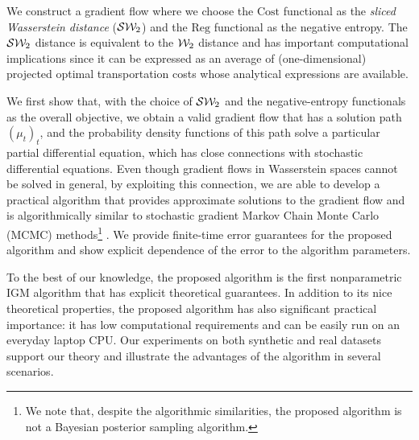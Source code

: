 We construct a gradient flow where we choose the $\mathrm{Cost}$ functional as the \textit{sliced Wasserstein distance} (${\cal S}{\cal W}_2$) \cite{rabin:et:al:2011,bonneel2015sliced} and the $\mathrm{Reg}$ functional as the negative entropy. The ${\cal S}{\cal W}_2$ distance is equivalent to the ${\cal W}_2$ distance \cite{bonnotte2013unidimensional} and has important computational implications since it can be expressed as an average of (one-dimensional) projected optimal transportation costs whose analytical expressions are available.

We first show that, with the choice of ${\cal S}{\cal W}_2$ and the negative-entropy functionals as the overall objective, we obtain a valid gradient flow that has a solution path $(\mu_t)_t$, and the probability density functions of this path solve a particular partial differential equation, which has close connections with stochastic differential equations. Even though gradient flows in Wasserstein spaces cannot be solved in general, by exploiting this connection, we are able to develop a practical algorithm that provides approximate solutions to the gradient flow and is algorithmically similar to stochastic gradient Markov Chain Monte Carlo (MCMC) methods\footnote{We note that, despite the algorithmic similarities, the proposed algorithm is not a Bayesian posterior sampling algorithm.} \cite{WelTeh2011a,ma2015complete,durmus2016stochastic,csimcsekli2017fractional,pmlr-v80-simsekli18a}. We provide finite-time error guarantees for the proposed algorithm and show explicit dependence of the error to the algorithm parameters.



To the best of our knowledge, the proposed algorithm is the first nonparametric IGM algorithm that has explicit theoretical guarantees. In addition to its nice theoretical properties, the proposed algorithm has also significant practical importance: it has low computational requirements and can be easily run on an everyday laptop CPU.%
Our experiments on both synthetic and real datasets support our theory and illustrate the advantages of the algorithm in several scenarios.







